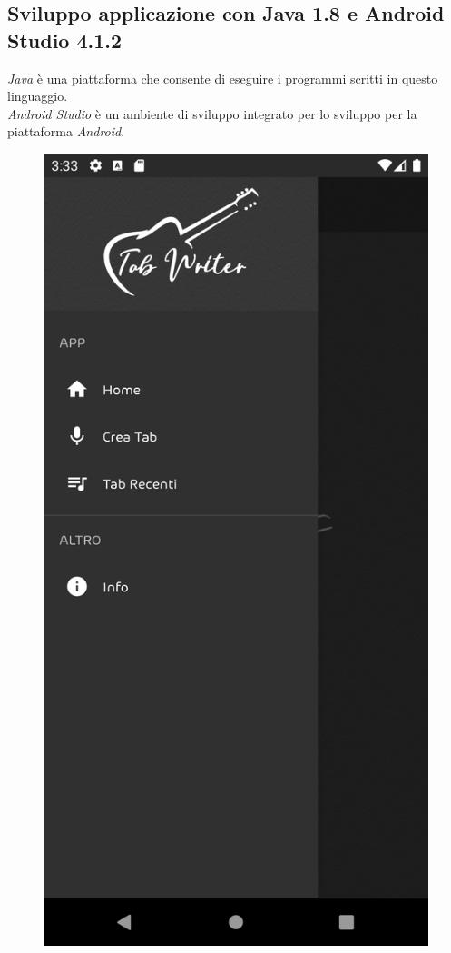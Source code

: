 \subsection{Sviluppo applicazione con Java 1.8 e Android Studio 4.1.2}
\textit{Java} è una piattaforma che consente di eseguire i programmi scritti in questo linguaggio.\\
\newline
\textit{Android Studio} è un ambiente di sviluppo integrato per lo sviluppo per la piattaforma \textit{Android}.\\
\newline
\begin{figure}[H]
	\centering
	\includegraphics[scale=0.10]{./images/img17.png}

\end{figure}
